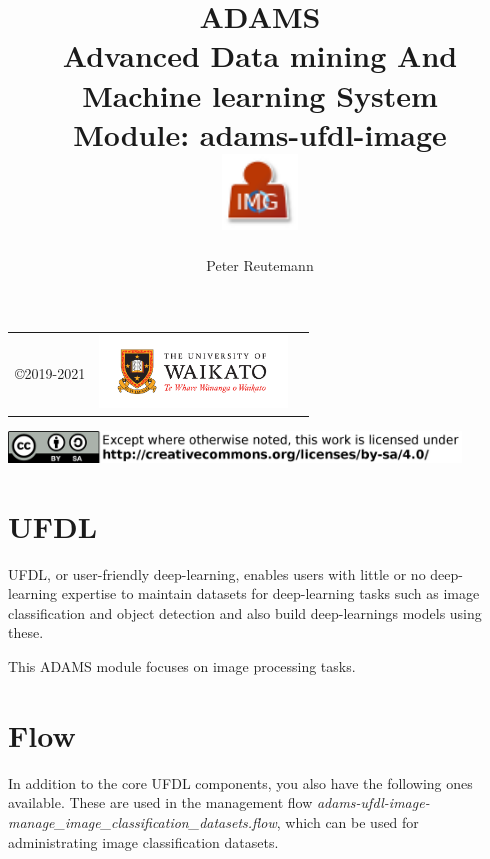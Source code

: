 \documentclass[a4paper]{book}
\title{
  \textbf{ADAMS} \\
  {\Large \textbf{A}dvanced \textbf{D}ata mining \textbf{A}nd \textbf{M}achine
  learning \textbf{S}ystem} \\
  {\Large Module: adams-ufdl-image} \\
  \vspace{1cm}
  \includegraphics[width=2cm]{images/ufdl-image-module.png} \\
}
\author{
  Peter Reutemann
}
\begin{document}
\begin{titlepage}
\maketitle

\thispagestyle{empty}
\center
\begin{table}[b]
	\begin{tabular}{c l l}
		\parbox[c][2cm]{2cm}{\copyright 2019-2021} &
		\parbox[c][2cm]{5cm}{\includegraphics[width=5cm]{images/coat_of_arms.pdf}} \\
	\end{tabular}
	\includegraphics[width=12cm]{images/cc.png} \\
\end{table}

\end{titlepage}

\tableofcontents

\chapter{UFDL}
UFDL, or user-friendly deep-learning, enables users with little or no deep-learning
expertise to maintain datasets for deep-learning tasks such as image classification
and object detection and also build deep-learnings models using these.

This ADAMS module focuses on image processing tasks.

\chapter{Flow}

In addition to the core UFDL components, you also have the following ones available.
These are used in the management flow \textit{adams-ufdl-image-manage\_image\_classification\_datasets.flow},
which can be used for administrating image classification datasets.
\end{document}
